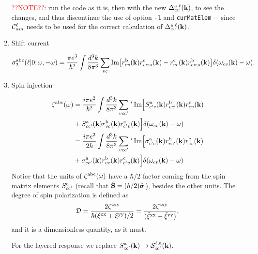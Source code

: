 \documentclass[12pt]{article}
\numberwithin{equation}{section}
\begin{document}
\begin{enumerate}
\textcolor{red}{??NOTE??}: run the code as it is, then with the new
$\Delta_{cv}^{\mathrm{a},\ell}(\mathbf{k})$, to see the 
changes, and thus discontinue the use of option \verb=-l= and \verb=curMatElem=
$\cdots$ since ${\cal C}^\ell_{nm}$ needs to be used for the correct
calculation of
$\Delta_{cv}^{\mathrm{a},\ell}(\mathbf{k})$.

\item Shift current

\begin{equation}\label{sigma}
\sigma^{\mathrm{a}\mathrm{b}\mathrm{c}}_2(\ell|0;\omega,-\omega) 
=
\frac{\pi e^3}{\hbar^2}
\int\frac{d^3k}{8\pi^3} 
\sum_{vc}
\mathrm{Im}
\big[ 
r^{\mathrm{b}}_{cv}(\mathbf{k}) 
r^{\mathrm{c}}_{vc;\mathrm{a}}(\mathbf{k}) 
-
r^{\mathrm{c}}_{vc}(\mathbf{k}) 
r^{\mathrm{b}}_{cv;\mathrm{a}}(\mathbf{k}) 
\big]
\delta(\omega_{cv}(\mathbf{k})-\omega) 
. 
\end{equation} 


\item Spin injection

\begin{align}\label{zetaabci}
\zeta^{\mathrm{abc}}(\omega)
&=
\frac{i\pi e^2}{\hbar^2}
\int\frac{d^3k}{8\pi^3}
\sum_{vcc'}\,'\,
\mathrm{Im}\Big[S^{\mathrm{a}}_{c'c}(\mathbf{k}) r^{\mathrm{b}}_{vc'}(\mathbf{k}) r^{\mathrm{c}}_{cv}(\mathbf{k}) 
\nonumber\\
&+ 
S^{\mathrm{a}}_{cc'}(\mathbf{k}) r^{\mathrm{b}}_{vc}(\mathbf{k}) r^{\mathrm{c}}_{c'v}(\mathbf{k})\Big]
\delta(\omega_{cv}(\mathbf{k})-\omega) 
\nonumber\\
&=
\frac{i\pi e^2}{2\hbar}
\int\frac{d^3k}{8\pi^3}
\sum_{vcc'}\,'\,
\mathrm{Im}\Big[\sigma^{\mathrm{a}}_{c'c}(\mathbf{k})
  r^{\mathrm{b}}_{vc'}(\mathbf{k}) r^{\mathrm{c}}_{cv}(\mathbf{k})  
\nonumber\\
&+ 
\sigma^{\mathrm{a}}_{cc'}(\mathbf{k}) r^{\mathrm{b}}_{vc}(\mathbf{k})
  r^{\mathrm{c}}_{c'v}(\mathbf{k})\Big] 
\delta(\omega_{cv}(\mathbf{k})-\omega) 
\end{align}
Notice that the units of $\zeta^{\mathrm{a}\mathrm{b}\mathrm{c}}(\omega)$ have a $\hbar/2$
factor coming from the spin matrix elements $S^{\mathrm{a}}_{cc'}$ (recall
that
$\hat {\mathbf{S}}=(\hbar/2)\hat{\boldsymbol{\sigma}}$), besides the other units.
The degree of spin polarization is defined as
\begin{equation}\label{dps}
{\cal
  D}=\frac{2\zeta^{\mathrm{z}\mathrm{x}\mathrm{y}}}{\hbar(\xi^{\mathrm{x}\mathrm{x}}+\xi^{\mathrm{y}\mathrm{y}})/2}
=\frac{2\zeta^{\mathrm{z}\mathrm{x}\mathrm{y}}}{(\tilde\xi^{\mathrm{x}\mathrm{x}}+\tilde\xi^{\mathrm{y}\mathrm{y}})}
,\nonumber
\end{equation}    
and it is a dimensionless quantity, as it must. 

For the layered response we replace 
$S^{\mathrm{a}}_{cc'}(\mathbf{k})\to {\cal  S}^{\ell,\mathrm{a}}_{cc'}(\mathbf{k})$.  



\end{enumerate}
\end{document}
